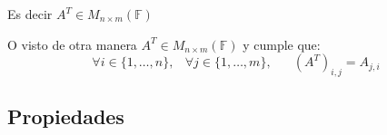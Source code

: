 \documentclass[12pt]{report}                                    %
\DeclareMathOperator \Space {\quad}                             %
\DeclareMathOperator \MiniSpace {\;}                            %
\begin{document}
                Es decir $A^T \in M_{n \times m}(\mathbb{F})$

                O visto de otra manera $A^T \in M_{n \times m}(\mathbb{F})$ y cumple que:
                \begin{equation}
                    \forall i \in \{1, \dots, n\} ,\MiniSpace
                        \forall j \in \{1, \dots, m\} ,\Space
                            (A^T)_{i, j} = A_{j, i}
                \end{equation}


            \clearpage
            \subsection{Propiedades}
\end{document}
